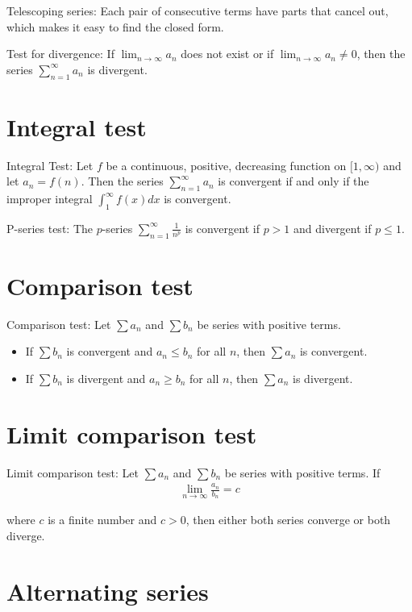 \documentclass{article}
\begin{document}
Telescoping series: Each pair of consecutive terms have parts that cancel out, which makes it easy to find the closed form.

Test for divergence: If $\lim_{n \to \infty} a_n$ does not exist or if $\lim_{n \to \infty} a_n \neq 0$, then the series $\sum_{n=1}^{\infty} a_n$ is divergent.

\section{Integral test}

Integral Test: Let $f$ be a continuous, positive, decreasing function on $[1, \infty)$ and let $a_n = f(n)$. Then the series $\sum_{n=1}^\infty a_n$ is convergent if and only if the improper integral $\int_1^\infty f(x) dx$ is convergent.

P-series test: The $p$-series $\sum_{n=1}^\infty \frac{1}{n^p}$ is convergent if $p > 1$ and divergent if $p \leq 1$.

\section{Comparison test}

Comparison test: Let $\sum a_n$ and $\sum b_n$ be series with positive terms.
\begin{itemize}
    \item If $\sum b_n$ is convergent and $a_n \leq b_n$ for all $n$, then $\sum a_n$ is convergent.
    \item If $\sum b_n$ is divergent and $a_n \geq b_n$ for all $n$, then $\sum a_n$ is divergent.
\end{itemize}

\section{Limit comparison test}

Limit comparison test: Let $\sum a_n$ and $\sum b_n$ be series with positive terms. If
\begin{gather*}
    \lim_{n \to \infty} \frac{a_n}{b_n} = c
\end{gather*}

where $c$ is a finite number and $c > 0$, then either both series converge or both diverge.

\section{Alternating series}
\end{document}
